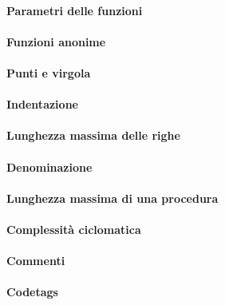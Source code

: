         \paragraph{Parametri delle funzioni} %
        
        \paragraph{Funzioni anonime} %
        
        \paragraph{Punti e virgola} %
        
        \paragraph{Indentazione} %
        
        \paragraph{Lunghezza massima delle righe} %
        
        \paragraph{Denominazione} %
        
        \paragraph{Lunghezza massima di una procedura} %
        
        \paragraph{Complessità ciclomatica} %
        
        \paragraph{Commenti} %
        
        \paragraph{Codetags} %
        
